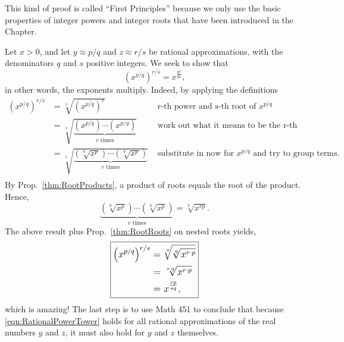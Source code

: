 \bigskip

\begin{tcolorbox}[title=\textcolor{black}{Proof of Prop.~\ref{thm:PowerTowers} (Power Towers) that Avoids the use of Logarithms}, sharp corners, colback=green!30, colframe=green!80!blue, breakable, fonttitle=\bfseries]
This kind of proof is called ``First Principles'' because we only use the basic properties of integer powers and integer roots that have been introduced in the Chapter. 
\end{tcolorbox}

Let $x>0$, and let $y \approx p/q$ and $z \approx r/s$ be rational approximations, with the denominators $q$ and $s$ positive integers. We seek to show that 
$$\left( x^{p/q} \right)^{r/s} = x^\frac{pr}{q s}, $$
in other words, the exponents multiply. Indeed, by applying the definitions
\begin{equation}
    \begin{aligned}
        \left( x^{p/q} \right)^{r/s} &= \sqrt[s]{\left(x^{p/q} \right)^r} & \text{ r-th power and s-th root of }x^{p/q}\\
        &= \sqrt[s]{\underbrace{\left(x^{p/q} \right) \cdots \left(x^{p/q} \right)}_{r \text{ times}} } & \text{ work out what it means to be the r-th power} \\
        & =\sqrt[s]{  \underbrace{ \left( \sqrt[q]{x^p}  \right) \cdots  \left( \sqrt[q]{x^p}  \right) 
 }_{r \text{ times}} } & \text{ substitute in now for }x^{p/q} \text{ and try to group terms}.\\
    \end{aligned}
\end{equation}
By Prop.~\ref{thm:RootProducts}, a product of roots equals the root of the product. Hence, 
$$  \underbrace{ \left( \sqrt[q]{x^p}  \right) \cdots  \left( \sqrt[q]{x^p}  \right) }_{r \text{ times}} = \sqrt[q]{x^{rp}}.$$
The above result plus Prop.~\ref{thm:RootRoots} on nested roots yields,
\begin{equation}
\label{eqn:RationalPowerTower}
   \boxed{  \mathlarger{
   \begin{aligned}
        \left( x^{p/q} \right)^{r/s} &= \sqrt[s]{ \sqrt[q]{ x^{r \cdot p }} } \\
        & = \sqrt[s \cdot q]{ x^{r \cdot p} } \\
        &= x^\frac{rp}{sq},  
    \end{aligned}
    } }
\end{equation}
which is amazing! The last step is to use Math 451 to conclude that because \eqref{eqn:RationalPowerTower} holds for all rational approximations of the real numbers $y$ and $z$, it must also hold for $y$ and $z$ themselves.
\Qed

